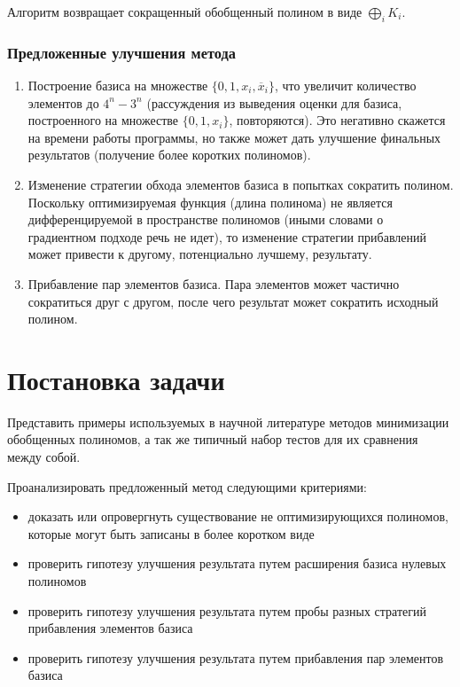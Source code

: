 \documentclass[a4paper,12pt,titlepage,finall]{article}
\begin{document}
Алгоритм возвращает сокращенный обобщенный полином в виде $ \bigoplus\limits_i K_i $.

\subsubsection{Предложенные улучшения метода}

\begin{enumerate}
    \item Построение базиса на множестве $ \{ 0, 1, x_i, \overline x_i \} $, что увеличит количество элементов до $ 4^n - 3^n $ (рассуждения из выведения оценки для базиса, построенного на множестве $ \{ 0, 1, x_i \} $, повторяются). Это негативно скажется на времени работы программы, но также может дать улучшение финальных результатов (получение более коротких полиномов).
    \item Изменение стратегии обхода элементов базиса в попытках сократить полином. Поскольку оптимизируемая функция (длина полинома) не является дифференцируемой в пространстве полиномов (иными словами о градиентном подходе речь не идет), то изменение стратегии прибавлений может привести к другому, потенциально лучшему, результату.
    \item Прибавление пар элементов базиса. Пара элементов может частично сократиться друг с другом, после чего результат может сократить исходный полином.
\end{enumerate}

\newpage

\section{Постановка задачи}

Представить примеры используемых в научной литературе методов минимизации обобщенных полиномов, а так же типичный набор тестов для их сравнения между собой.

Проанализировать предложенный метод следующими критериями:
\begin{itemize}
    \item доказать или опровергнуть существование не оптимизирующихся полиномов, которые могут быть записаны в более коротком виде
    \item проверить гипотезу улучшения результата путем расширения базиса нулевых полиномов
    \item проверить гипотезу улучшения результата путем пробы разных стратегий прибавления элементов базиса
    \item проверить гипотезу улучшения результата путем прибавления пар элементов базиса
\end{itemize}
\end{document}
